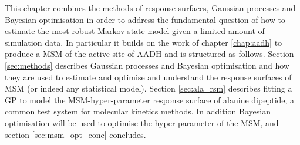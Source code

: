 This chapter combines the methods of response surfaces, Gaussian processes and Bayesian optimisation in order to address the fundamental question of how to estimate the most robust Markov state model given a limited amount of simulation data. In particular it builds on the work of chapter \ref{chap:aadh} to produce a MSM of the active site of AADH and is structured as follows. Section \ref{sec:methods} describes Gaussian processes  and Bayesian optimisation  and how they are used to estimate and optimise and understand the response surfaces of MSM (or indeed any statistical model). Section \ref{sec:ala_rsm} describes fitting a GP to model the MSM-hyper-parameter response surface of alanine dipeptide, a common test system for  molecular kinetics methods. In addition Bayesian optimisation will be used to optimise the hyper-parameter of the MSM, and section \ref{sec:msm_opt_conc} concludes. 





